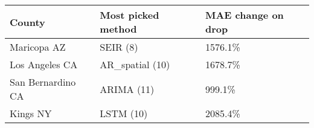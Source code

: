 \begin{tabular}{lp{25mm}p{20mm}}
\toprule
County & Most picked \newline method &  MAE change \newline on drop\\
\midrule
Maricopa AZ & SEIR (8) &   1576.1\% \\
Los Angeles CA &    AR\_spatial (10) &  1678.7\% \\
San Bernardino CA &         ARIMA (11) & 999.1\% \\
Kings NY &          LSTM (10) & 2085.4\% \\
\bottomrule
\end{tabular}
